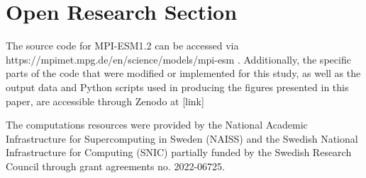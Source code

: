 \documentclass[draft]{agujournal2019}
\begin{document}
%
%

\section*{Open Research Section}
The source code for MPI-ESM1.2 can be accessed via https://mpimet.mpg.de/en/science/models/mpi-esm \cite{Mauritsen_2019}. Additionally, the specific parts of the code that were modified or implemented for this study, as well as the output data and Python scripts used in producing the figures presented in this paper, are accessible through Zenodo at [link] \cite{}




\acknowledgments
The computations resources were provided by the National Academic Infrastructure for Supercomputing in Sweden (NAISS) and the Swedish National Infrastructure for Computing (SNIC) partially funded by the Swedish Research Council through grant agreements no. 2022-06725.


%
 
%

%



%
%
%
%
%
\end{document}
